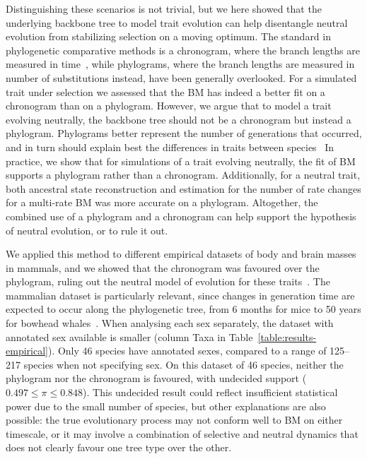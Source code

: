 \documentclass{article}
\newcommand{\PhyloSupport}{\pi}
\begin{document}
Distinguishing these scenarios is not trivial, but we here showed that the underlying backbone tree to model trait evolution can help disentangle neutral evolution from stabilizing selection on a moving optimum.
The standard in phylogenetic comparative methods is a chronogram, where the branch lengths are measured in time~\citep{felsenstein_phylogenies_1985, harmon_phylogenetic_2018}, while phylograms, where the branch lengths are measured in number of substitutions instead, have been generally overlooked.
For a simulated trait under selection we assessed that the BM has indeed a better fit on a chronogram than on a phylogram.
However, we argue that to model a trait evolving neutrally, the backbone tree should not be a chronogram but instead a phylogram.
Phylograms better represent the number of generations that occurred, and in turn should explain best the differences in traits between species~\citep{latrille_detecting_2024}
In practice, we show that for simulations of a trait evolving neutrally, the fit of BM supports a phylogram rather than a chronogram.
Additionally, for a neutral trait, both ancestral state reconstruction and estimation for the number of rate changes for a multi-rate BM was more accurate on a phylogram.
Altogether, the combined use of a phylogram and a chronogram can help support the hypothesis of neutral evolution, or to rule it out.

We applied this method to different empirical datasets of body and brain masses in mammals, and we showed that the chronogram was favoured over the phylogram, ruling out the neutral model of evolution for these traits~\citep{latrille_detecting_2024}.
The mammalian dataset is particularly relevant, since changes in generation time are expected to occur along the phylogenetic tree, from 6 months for mice to 50 years for bowhead whales~\citep{demagalhaes_database_2009, nielsen_eye_2016}.
When analysing each sex separately, the dataset with annotated sex available is smaller (column Taxa in Table~\ref{table:results-empirical}).
Only 46 species have annotated sexes, compared to a range of 125--217 species when not specifying sex.
On this dataset of 46 species, neither the phylogram nor the chronogram is favoured, with undecided support ($0.497 \leq \PhyloSupport \leq 0.848$).
This undecided result could reflect insufficient statistical power due to the small number of species, but other explanations are also possible: the true evolutionary process may not conform well to BM on either timescale, or it may involve a combination of selective and neutral dynamics that does not clearly favour one tree type over the other.
\end{document}
